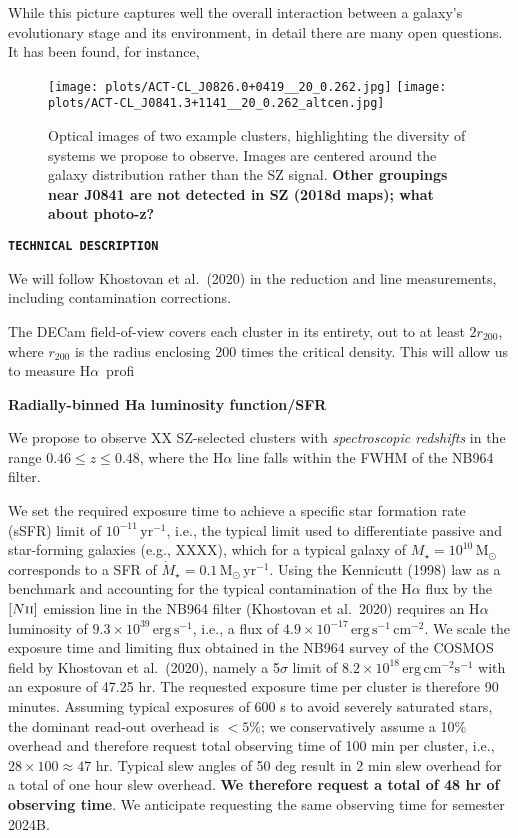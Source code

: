 \documentclass[12pt]{article}
\newcommand{\ha}{H$\alpha$}
\newcommand{\Msun}{\mathrm{M}_\odot}
\begin{document}
While this picture captures well the overall interaction between a galaxy's evolutionary stage and its environment, in detail there are many open questions. It has been found, for instance, 



\begin{figure}
\centering
\texttt{[image: plots/ACT-CL\_J0826.0+0419\_\_20\_0.262.jpg]}
\texttt{[image: plots/ACT-CL\_J0841.3+1141\_\_20\_0.262\_altcen.jpg]}
\caption{Optical images of two example clusters, highlighting the diversity of systems we propose to observe. Images are centered around the galaxy distribution rather than the SZ signal. \textbf{Other groupings near J0841 are not detected in SZ (2018d maps); what about photo-z?}}
\label{f:imgs}
\end{figure}



\clearpage
\texttt{\textbf{TECHNICAL DESCRIPTION} \\ }

We will follow Khostovan et al.\ (2020) in the reduction and line measurements, including contamination corrections.

The DECam field-of-view covers each cluster in its entirety, out to at least $2r_{200}$, where $r_{200}$ is the radius enclosing 200 times the critical density. This will allow us to measure \ha\ profi

\textbf{Radially-binned Ha luminosity function/SFR}

We propose to observe XX SZ-selected clusters with \textit{spectroscopic redshifts} in the range $0.46\leq z\leq0.48$, where the H$\alpha$ line falls within the FWHM of the NB964 filter. 

We set the required exposure time to achieve a specific star formation rate (sSFR) limit of $10^{-11}\,\mathrm{yr^{-1}}$, i.e., the typical limit used to differentiate passive and star-forming galaxies (e.g., XXXX), which for a typical galaxy of $M_\star=10^{10}\,\Msun$ corresponds to a SFR of $\dot M_\star = 0.1\,\Msun\,\mathrm{yr^{-1}}$. Using the Kennicutt (1998) law as a benchmark and accounting for the typical contamination of the H$\alpha$ flux by the $[N\textsc{ii}]$ emission line in the NB964 filter (Khostovan et al.\ 2020) requires an H$\alpha$ luminosity of $9.3\times10^{39}\,\mathrm{erg\,s^{-1}}$, i.e., a flux of $4.9\times10^{-17}\,\mathrm{erg\,s^{-1}\,cm^{-2}}$. We scale the exposure time and limiting flux obtained in the NB964 survey of the COSMOS field by Khostovan et al.\ (2020), namely a 5$\sigma$ limit of $8.2\times10^{18}\,\mathrm{erg\,cm^{-2}s^{-1}}$ with an exposure of 47.25 hr. The requested exposure time per cluster is therefore 90 minutes. Assuming typical exposures of 600 s to avoid severely saturated stars, the dominant read-out overhead is $<5\%$; we conservatively assume a 10\% overhead and therefore request total observing time of 100 min per cluster, i.e., $28\times100\approx47$ hr. Typical slew angles of 50 deg result in 2 min slew overhead for a total of one hour slew overhead. \textbf{We therefore request a total of 48 hr of observing time}. We anticipate requesting the same observing time for semester 2024B.
\end{document}

